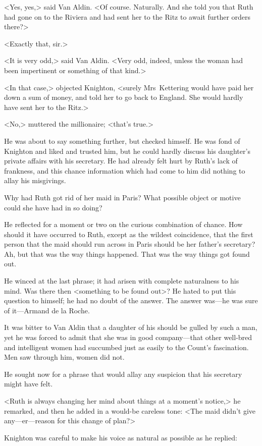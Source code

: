 <Yes, yes,> said Van Aldin. <Of course. Naturally. And she told you that Ruth had gone on to the Riviera and had sent her to the Ritz to await further orders there?>

<Exactly that, sir.>

<It is very odd,> said Van Aldin. <Very odd, indeed, unless the woman had been impertinent or something of that kind.>

<In that case,> objected Knighton, <surely Mrs~Kettering would have paid her down a sum of money, and told her to go back to England. She would hardly have sent her to the Ritz.>

<No,> muttered the millionaire; <that's true.>

He was about to say something further, but checked himself. He was fond of Knighton and liked and trusted him, but he could hardly discuss his daughter's private affairs with his secretary. He had already felt hurt by Ruth's lack of frankness, and this chance information which had come to him did nothing to allay his misgivings.

Why had Ruth got rid of her maid in Paris? What possible object or motive could she have had in so doing?

He reflected for a moment or two on the curious combination of chance. How should it have occurred to Ruth, except as the wildest coincidence, that the first person that the maid should run across in Paris should be her father's secretary? Ah, but that was the way things happened. That was the way things got found out.

He winced at the last phrase; it had arisen with complete naturalness to his mind. Was there then <something to be found out>? He hated to put this question to himself; he had no doubt of the answer. The answer was—he was sure of it—Armand de la Roche.

It was bitter to Van Aldin that a daughter of his should be gulled by such a man, yet he was forced to admit that she was in good company—that other well-bred and intelligent women had succumbed just as easily to the Count's fascination. Men saw through him, women did not.

He sought now for a phrase that would allay any suspicion that his secretary might have felt.

<Ruth is always changing her mind about things at a moment's notice,> he remarked, and then he added in a would-be careless tone: <The maid didn't give any—er—reason for this change of plan?>

Knighton was careful to make his voice as natural as possible as he replied:

